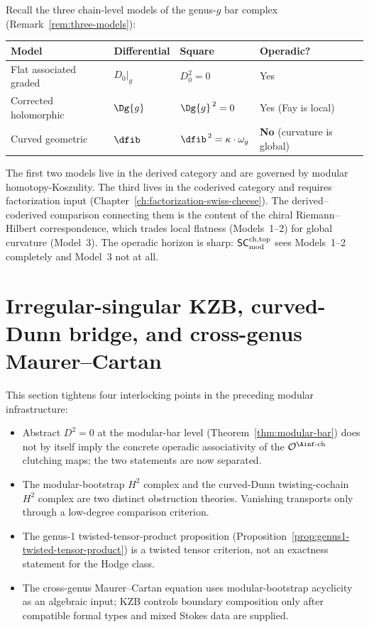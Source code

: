 \begin{remark}
\label{rem:three-models-operadic}
Recall the three chain-level models of the genus-$g$ bar complex
(Remark~\ref{rem:three-models}):
\renewcommand{\arraystretch}{1.25}
\begin{center}
\begin{tabular}{@{}llll@{}}
\toprule
\textbf{Model} & \textbf{Differential} & \textbf{Square} & \textbf{Operadic?} \\
\midrule
Flat associated graded
 & $D_0\big|_g$
 & $D_0^2 = 0$
 & Yes \\[3pt]
Corrected holomorphic
 & $\Dg{g}$
 & $\Dg{g}^{\,2} = 0$
 & Yes (Fay is local) \\[3pt]
Curved geometric
 & $\dfib$
 & $\dfib^{\,2} = \kappa \cdot \omega_g$
 & \textbf{No} (curvature is global) \\
\bottomrule
\end{tabular}
\end{center}
\smallskip\noindent
The first two models live in the derived category and are governed
by modular homotopy-Koszulity. The third lives in the coderived
category and requires factorization input
(Chapter~\ref{ch:factorization-swiss-cheese}). The
derived--coderived comparison connecting them is the content of the
chiral Riemann--Hilbert correspondence, which trades local flatness
(Models~1--2) for global curvature (Model~3). The operadic
horizon is sharp: $\mathsf{SC}^{\mathrm{ch,top}}_{\mathrm{mod}}$ sees Models~1--2 completely and
Model~3 not at all.
\end{remark}


\section{Irregular-singular KZB,
 curved-Dunn bridge, and cross-genus Maurer--Cartan}
\label{sec:irregular-kzb-curved-dunn-mc}

This section tightens four interlocking points in the preceding
modular infrastructure:
\begin{itemize}\setlength\itemsep{2pt}
\item Abstract $D^2 = 0$ at the modular-bar level
 (Theorem~\ref{thm:modular-bar}) does not by itself imply the
 concrete operadic associativity of the $\mathcal{O}^{\Ainf\text{-ch}}$
 clutching maps; the two statements are now separated.
\item The modular-bootstrap $H^2$ complex and the curved-Dunn
 twisting-cochain $H^2$ complex are two distinct obstruction
 theories. Vanishing transports only through a low-degree
 comparison criterion.
\item The genus-1 twisted-tensor-product proposition
 (Proposition~\ref{prop:genus1-twisted-tensor-product}) is a
 twisted tensor criterion, not an exactness statement for the Hodge
 class.
\item The cross-genus Maurer--Cartan equation uses modular-bootstrap
 acyclicity as an algebraic input; KZB controls boundary composition
 only after compatible formal types and mixed Stokes data are supplied.
\end{itemize}

